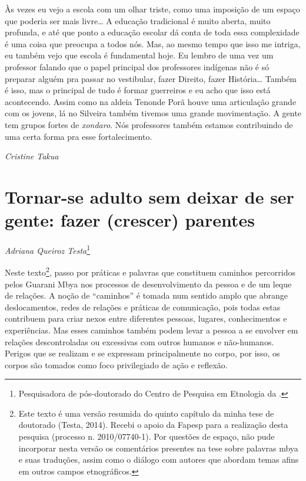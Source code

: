 Às vezes eu vejo a escola com um olhar triste, como uma imposição de um
espaço que poderia ser mais livre\ldots{} A educação tradicional é muito
aberta, muito profunda, e até que ponto a educação escolar dá conta de
toda essa complexidade é uma coisa que preocupa a todos nós. Mas, ao
mesmo tempo que isso me intriga, eu também vejo que escola é
fundamental hoje. Eu lembro de uma vez um professor falando que o papel
principal dos professores indígenas não é só preparar alguém pra passar
no vestibular, fazer Direito, fazer História\ldots{} Também é isso, mas o
principal de tudo é formar guerreiros e eu acho que isso está
acontecendo. Assim como na aldeia Tenonde Porã houve uma articulação
grande com os jovens, lá no Silveira também tivemos uma grande
movimentação. A gente tem grupos fortes de \emph{xondaro}. Nós professores
também estamos contribuindo de uma certa forma pra esse fortalecimento.
\medskip
\begin{flushright}
\emph{Cristine Takua}
\end{flushright}

\chapter{Tornar-se adulto sem deixar de ser gente: fazer (crescer)
parentes}
\begin{flushright}
\emph{Adriana Queiroz Testa}\footnote{Pesquisadora de pós-doutorado do Centro
de Pesquisa em Etnologia da .}
\end{flushright}

Neste texto\footnote{Este texto é uma versão resumida do quinto capítulo
da minha tese de doutorado (Testa, 2014). Recebi o apoio da Fapesp para
a realização desta pesquisa (processo n. 2010/07740-1). Por questões de
espaço, não pude incorporar nesta versão os comentários presentes na
tese sobre palavras mbya e suas traduções, assim como o diálogo com
autores que abordam temas afins em outros campos etnográficos.}, passo
por práticas e palavras que constituem caminhos percorridos pelos
Guarani Mbya nos processos de desenvolvimento da pessoa e de um leque
de relações. A noção de ``caminhos'' é tomada num sentido amplo que abrange
deslocamentos, redes de relações e práticas de comunicação, pois todas
estas contribuem para criar nexos entre diferentes pessoas, lugares,
conhecimentos e experiências. Mas esses caminhos também podem levar a
pessoa a se envolver em relações descontroladas ou excessivas com
outros humanos e não-humanos. Perigos que se realizam e se expressam
principalmente no corpo, por isso, os corpos são tomados como foco
privilegiado de ação e reflexão.


